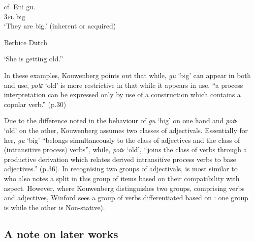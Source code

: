 cf.
\gll        Eni gu.\\
	\textsc{3pl} big \\
\glt      `They are big.' (inherent or acquired) \z \z

\ea%
\label{ex:3:14}

Berbice Dutch\\

\glt `She is getting old.''  \z \z %

In these examples, Kouwenberg points out that while, \textit{gu} `big'
can appear in both  and  use, \textit{potɛ}
 `old' is more restrictive in that while it appears in  use,
``a process interpretation can be expressed only by use of a
construction which contains a copular verb.” (p.30)

Due to the difference noted in the behaviour of \textit{gu} `big' on
one hand and \textit{potɛ} `old' on the other, Kouwenberg assumes two
classes of adjectivals. Essentially for her, \textit{gu} `big'
``belongs simultaneously to the class of adjectives and the class of
(intransitive process) verbs”, while, \textit{potɛ} `old', “joins
the class of verbs through a productive derivation which relates
derived intransitive process verbs to base adjectives.” (p.36).  In
recognising two groups of adjectivals, \citet{Kouwenberg1996} is most
similar to \citet{Winford1993} who also notes a split in this group of
items based on their compatibility with  aspect.  However,
where Kouwenberg distinguishes two groups, comprising verbs and
adjectives, Winford sees a group of verbs differentiated based on
: one group is  while the other is Non-stative).

\subsection{ A note on later works}\label{sec:3.1.3}

